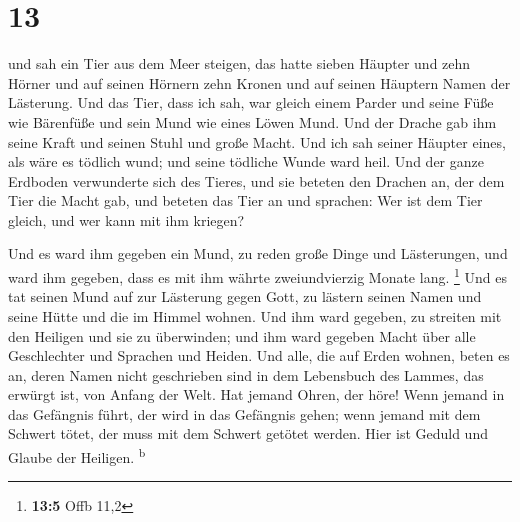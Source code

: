 \hypertarget{section-12}{%
\section{13}\label{section-12}}

 und sah ein Tier aus dem Meer steigen, das hatte sieben
Häupter und zehn Hörner und auf seinen Hörnern zehn Kronen und auf
seinen Häuptern Namen der Lästerung.  Und das Tier, dass
ich sah, war gleich einem Parder und seine Füße wie Bärenfüße und sein
Mund wie eines Löwen Mund. Und der Drache gab ihm seine Kraft und seinen
Stuhl und große Macht.  Und ich sah seiner Häupter eines,
als wäre es tödlich wund; und seine tödliche Wunde ward heil. Und der
ganze Erdboden verwunderte sich des Tieres,  und sie
beteten den Drachen an, der dem Tier die Macht gab, und beteten das Tier
an und sprachen: Wer ist dem Tier gleich, und wer kann mit ihm kriegen?

 Und es ward ihm gegeben ein Mund, zu reden große Dinge
und Lästerungen, und ward ihm gegeben, dass es mit ihm währte
zweiundvierzig Monate lang. \footnote{\textbf{13:5} Offb 11,2}
 Und es tat seinen Mund auf zur Lästerung gegen Gott, zu
lästern seinen Namen und seine Hütte und die im Himmel wohnen.
 Und ihm ward gegeben, zu streiten mit den Heiligen und
sie zu überwinden; und ihm ward gegeben Macht über alle Geschlechter und
Sprachen und Heiden.  Und alle, die auf Erden wohnen,
beten es an, deren Namen nicht geschrieben sind in dem Lebensbuch des
Lammes, das erwürgt ist, von Anfang der Welt.  Hat jemand
Ohren, der höre!  Wenn jemand in das Gefängnis führt, der
wird in das Gefängnis gehen; wenn jemand mit dem Schwert tötet, der muss
mit dem Schwert getötet werden. Hier ist Geduld und Glaube der Heiligen.
\textsuperscript{b}

